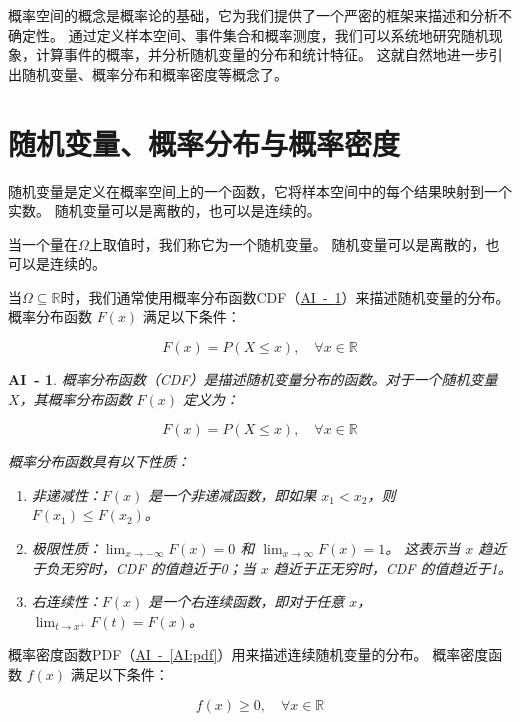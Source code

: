 \documentclass[a4paper]{ctexart}
\newtheorem{AI}{AI~-}
\newcommand{\airef}[1]{\hyperref[#1]{AI~-~\ref*{#1}}}
\begin{document}
概率空间的概念是概率论的基础，它为我们提供了一个严密的框架来描述和分析不确定性。
通过定义样本空间、事件集合和概率测度，我们可以系统地研究随机现象，计算事件的概率，并分析随机变量的分布和统计特征。
这就自然地进一步引出随机变量、概率分布和概率密度等概念了。

\section{随机变量、概率分布与概率密度}

随机变量是定义在概率空间上的一个函数，它将样本空间中的每个结果映射到一个实数。
随机变量可以是离散的，也可以是连续的。

当一个量在$\Omega$上取值时，我们称它为一个随机变量。
随机变量可以是离散的，也可以是连续的。

当$\Omega \subseteq \mathbb{R}$时，我们通常使用概率分布函数CDF（\airef{AI:cdf}）来描述随机变量的分布。
概率分布函数 $F(x)$ 满足以下条件：

\begin{equation}
    F(x) = P(X \leq x), \quad \forall x \in \mathbb{R}
\end{equation}

\begin{AI}\label{AI:cdf}
    概率分布函数（CDF）是描述随机变量分布的函数。对于一个随机变量 $X$，其概率分布函数 $F(x)$ 定义为：

    \begin{equation}
        F(x) = P(X \leq x), \quad \forall x \in \mathbb{R}
    \end{equation}

    概率分布函数具有以下性质：
    \begin{enumerate}
        \item 非递减性：$F(x)$ 是一个非递减函数，即如果 $x_1 < x_2$，则 $F(x_1) \leq F(x_2)$。
        \item 极限性质：$\lim_{x \to -\infty} F(x) = 0$ 和 $\lim_{x \to \infty} F(x) = 1$。
              这表示当 $x$ 趋近于负无穷时，CDF 的值趋近于0；当 $x$ 趋近于正无穷时，CDF 的值趋近于1。
        \item 右连续性：$F(x)$ 是一个右连续函数，即对于任意 $x$，$\lim_{t \to x^+} F(t) = F(x)$。
    \end{enumerate}
\end{AI}

概率密度函数PDF（\airef{AI:pdf}）用来描述连续随机变量的分布。
概率密度函数 $f(x)$ 满足以下条件：

\begin{equation}
    f(x) \geq 0, \quad \forall x \in \mathbb{R}
\end{equation}
\end{document}
